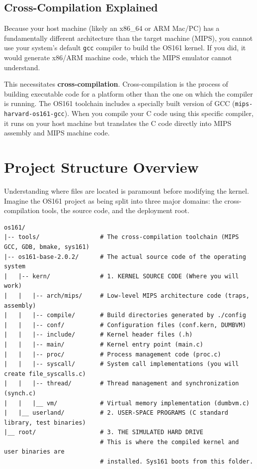 \subsection{Cross-Compilation Explained}
Because your host machine (likely an x86\_64 or ARM Mac/PC) has a fundamentally different architecture than the target machine (MIPS), you cannot use your system's default \texttt{gcc} compiler to build the OS161 kernel. If you did, it would generate x86/ARM machine code, which the MIPS emulator cannot understand.

This necessitates \textbf{cross-compilation}. Cross-compilation is the process of building executable code for a platform other than the one on which the compiler is running. The OS161 toolchain includes a specially built version of GCC (\texttt{mips-harvard-os161-gcc}). When you compile your C code using this specific compiler, it runs on your host machine but translates the C code directly into MIPS assembly and MIPS machine code.

\section{Project Structure Overview}
Understanding where files are located is paramount before modifying the kernel. Imagine the OS161 project as being split into three major domains: the cross-compilation tools, the source code, and the deployment root.

\begin{verbatim}
os161/
|-- tools/                 # The cross-compilation toolchain (MIPS GCC, GDB, bmake, sys161)
|-- os161-base-2.0.2/      # The actual source code of the operating system
|   |-- kern/              # 1. KERNEL SOURCE CODE (Where you will work)
|   |   |-- arch/mips/     # Low-level MIPS architecture code (traps, assembly)
|   |   |-- compile/       # Build directories generated by ./config
|   |   |-- conf/          # Configuration files (conf.kern, DUMBVM)
|   |   |-- include/       # Kernel header files (.h)
|   |   |-- main/          # Kernel entry point (main.c)
|   |   |-- proc/          # Process management code (proc.c)
|   |   |-- syscall/       # System call implementations (you will create file_syscalls.c)
|   |   |-- thread/        # Thread management and synchronization (synch.c)
|   |   |__ vm/            # Virtual memory implementation (dumbvm.c)
|   |__ userland/          # 2. USER-SPACE PROGRAMS (C standard library, test binaries)
|__ root/                  # 3. THE SIMULATED HARD DRIVE
                           # This is where the compiled kernel and user binaries are 
                           # installed. Sys161 boots from this folder.
\end{verbatim}

